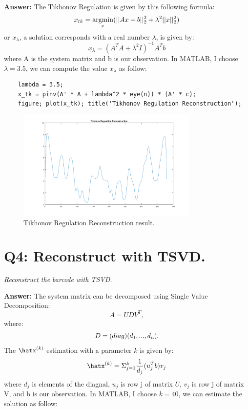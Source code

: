 \documentclass[a4paper,12pt]{article}
\newcommand{\argmin}{\operatornamewithlimits{argmin}}
\newcommand{\NiceHat}[1]{\expandafter\hat#1}
\begin{document}
\vspace{1.5em}
\noindent
\textbf{Answer:} 
\noindent
The Tikhonov Regulation is given by this following formula:
$$ x_{tk} = \argmin_x (||Ax-b||^2_2 + \lambda^2||x||^2_2) $$
or $x_\lambda$, a solution corresponds with a real number $\lambda$, is given by:
$$ x_{\lambda} = (A^TA + \lambda^2I)^{-1}A^Tb $$
where A is the system matrix and b is our observation. In MATLAB, I choose $\lambda = 3.5$, we can compute the value $x_{\lambda}$ as follow:

\begin{lstlisting}[caption={MATLAB code for Tikhonov Regulation with $\lambda = 3.5$.}]
	% Tikhonov Regulation solution 
	lambda = 3.5;
	x_tk = pinv(A' * A + lambda^2 * eye(n)) * (A' * c);
	figure; plot(x_tk); title('Tikhonov Regulation Reconstruction');
\end{lstlisting}

\begin{figure}[H]
	\centering
	\includegraphics[width=0.8\textwidth]{TK_graph.png}
	\caption{Tikhonov Regulation Reconstruction result.}
	\label{fig:tk}
\end{figure}


\pagebreak
\section*{Q4: Reconstruct with TSVD.}
\setcounter{section}{1}

\textit{Reconstruct the barcode with TSVD.} 

\vspace{1.5em}
\noindent
\textbf{Answer:} 
\noindent
The system matrix can be decomposed using Single Value Decomposition:
$$ A = UDV^T, $$
where:
$$ D = \mbox(diag)(d_1,...,d_n). $$
The $\NiceHat{x^{(k)}}$ estimation with a parameter $k$ is given by:
$$  \NiceHat{x^{(k)}} = \Sigma_{j=1}^{k} \frac{1}{d_j} (u^T_j b)v_j  $$
where $d_j$ is elements of the diagnal, $u_j$ is row j of matrix $U$, $v_j$ is row j of matrix V, and b is our observation. In MATLAB, I choose $k = 40$, we can estimate the solution as follow:
\end{document}
